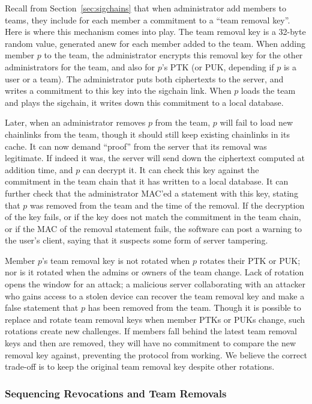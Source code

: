 Recall from Section~\ref{sec:sigchains} that when administrator add members to
teams, they include for each member a commitment to a ``team removal key''. Here
is where this mechanism comes into play. The team removal key is a 32-byte
random value, generated anew for each member added to the team. When adding
member $p$ to the team, the administrator encrypts this removal key for the
other administrators for the team, and also for $p$'s PTK (or PUK, depending if
$p$ is a user or a team). The administrator puts both ciphertexts to the server,
and writes a commitment to this key into the sigchain link. When $p$ loads the 
team and plays the sigchain, it writes down this commitment to a local database.

Later, when an administrator removes $p$ from the team, $p$ will fail to load
new chainlinks from the team, though it should still keep existing chainlinks
in its cache. It can now demand ``proof'' from the server that its removal
was legitimate. If indeed it was, the server will send down the ciphertext
computed at addition time, and $p$ can decrypt it. It can check this key
against the commitment in the team chain that it has written to a local database.
It can further check that the administrator MAC'ed a statement with this
key, stating that $p$ was removed from the team and the time of the removal.
If the decryption of the key fails, or if the key does not match the commitment
in the team chain, or if the MAC of the removal statement fails, the software
can post a warning to the user's client, saying that it suspects some form
of server tampering.

Member $p$'s team removal key is not rotated when $p$ rotates their PTK or PUK;
nor is it rotated when the admins or owners of the team change. Lack of rotation
opens the window for an attack; a malicious server collaborating with an
attacker who gains access to a stolen device can recover the team removal key
and make a false statement that $p$ has been removed from the team. Though it is 
possible to replace and rotate team removal keys when member PTKs or PUKs change,
such rotations create new challenges. If members fall behind the latest
team removal keys and then are removed, they will have no commitment to 
compare the new removal key against, preventing the protocol from working.
We believe the correct trade-off is to keep the original team removal key
despite other rotations.

\subsubsection{Sequencing Revocations and Team Removals}

